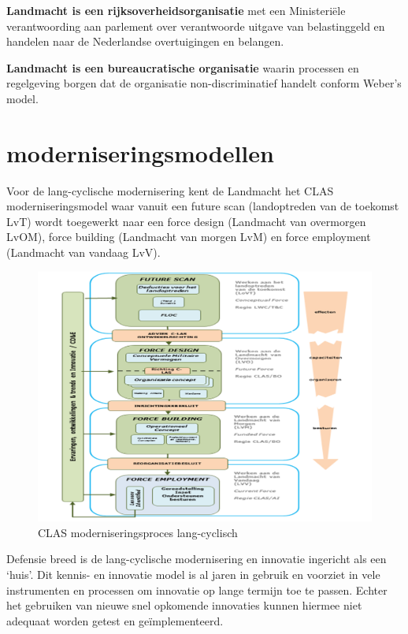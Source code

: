 \documentclass[
]{book}
\begin{document}
\textbf{Landmacht is een rijksoverheidsorganisatie}
met een Ministeriële verantwoording aan parlement over verantwoorde uitgave van belastinggeld en handelen naar de Nederlandse overtuigingen en belangen.

\textbf{Landmacht is een bureaucratische organisatie}
waarin processen en regelgeving borgen dat de organisatie non-discriminatief handelt conform Weber's model.

\hypertarget{moderniseringsmodellen}{%
\section{moderniseringsmodellen}\label{moderniseringsmodellen}}

Voor de lang-cyclische modernisering kent de Landmacht het CLAS moderniseringsmodel waar vanuit een future scan (landoptreden van de toekomst LvT) wordt toegewerkt naar een force design (Landmacht van overmorgen LvOM), force building (Landmacht van morgen LvM) en force employment (Landmacht van vandaag LvV).

\begin{figure}

{\centering \includegraphics[width=14.29in]{data/images/BO-2016-CLAS-moderniseringsmodel} 

}

\caption{CLAS moderniseringsproces lang-cyclisch }\label{fig:unnamed-chunk-4}
\end{figure}

Defensie breed is de lang-cyclische modernisering en innovatie ingericht als een `huis'. Dit kennis- en innovatie model is al jaren in gebruik en voorziet in vele instrumenten en processen om innovatie op lange termijn toe te passen. Echter het gebruiken van nieuwe snel opkomende innovaties kunnen hiermee niet adequaat worden getest en geïmplementeerd.
\end{document}
